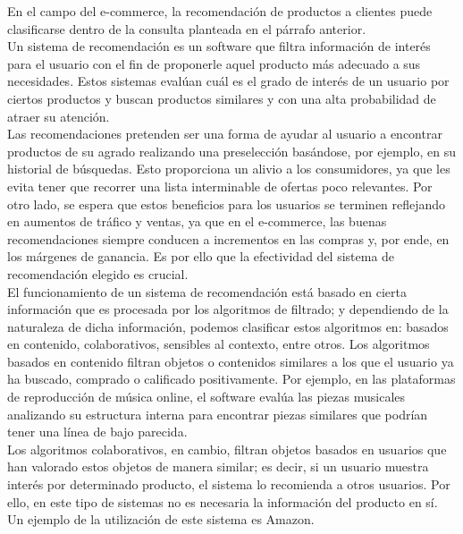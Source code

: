 En el campo del e-commerce, la recomendaci\'on de productos a clientes puede clasificarse dentro de la consulta planteada en el p\'arrafo anterior.\\

Un sistema de recomendaci\'on es un software que filtra informaci\'on de inter\'es para el usuario con el fin de proponerle aquel producto m\'as adecuado a sus necesidades. Estos sistemas eval\'uan cu\'al es el grado de inter\'es de un usuario por ciertos productos y buscan productos similares y con una alta probabilidad de atraer su atenci\'on.\\

Las recomendaciones pretenden ser una forma de ayudar al usuario a encontrar productos de su agrado realizando una preselecci\'on bas\'andose, por ejemplo, en su historial de b\'usquedas. Esto proporciona un alivio a los consumidores, ya que les evita tener que recorrer una lista interminable de ofertas poco relevantes. Por otro lado, se espera que estos beneficios para los usuarios se terminen reflejando en aumentos de tr\'afico y ventas, ya que en el e-commerce, las buenas recomendaciones siempre conducen a incrementos en las compras y, por ende, en los m\'argenes de ganancia. Es por ello que la efectividad del sistema de recomendaci\'on elegido es crucial.\\

El funcionamiento de un sistema de recomendaci\'on est\'a basado en cierta informaci\'on que es procesada por los algoritmos de filtrado; y dependiendo de la naturaleza de dicha informaci\'on, podemos clasificar estos algoritmos en: basados en contenido, colaborativos, sensibles al contexto, entre otros.
Los algoritmos basados en contenido filtran objetos o contenidos similares a los que el usuario ya ha buscado, comprado o calificado positivamente. Por ejemplo, en las plataformas de reproducci\'on de m\'usica online, el software eval\'ua las piezas musicales analizando su estructura interna para encontrar piezas similares que podr\'ian tener una l\'inea de bajo parecida.\\

Los algoritmos colaborativos, en cambio, filtran objetos basados en usuarios que han valorado estos objetos de manera similar; es decir, si un usuario muestra inter\'es por determinado producto, el sistema lo recomienda a otros usuarios. Por ello, en este tipo de sistemas no es necesaria la informaci\'on del producto en s\'i. Un ejemplo de la utilizaci\'on de este sistema es Amazon.\\

